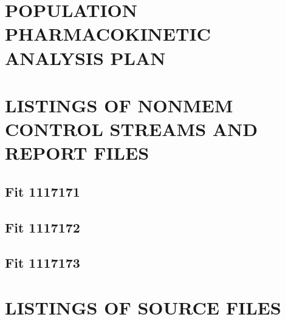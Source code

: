 

\section{POPULATION PHARMACOKINETIC ANALYSIS PLAN}
\label{sec:DAP}
%

\clearpage

\section{LISTINGS OF NONMEM CONTROL STREAMS AND REPORT FILES}
\label{sec:NMN}

\subsection{Fit \texorpdfstring{{\selectfont\textnumero}}{no.} 1117171}
\label{sec:nm.basemodel}
\lstset{breaklines=true, numbers=none, language=, basicstyle=\tiny\ttfamily, columns=flexible}


\clearpage

\subsection{Fit \texorpdfstring{{\selectfont\textnumero}}{no.} 1117172}
\label{sec:nm.fullcovmodel}


\clearpage

\subsection{Fit \texorpdfstring{{\selectfont\textnumero}}{no.} 1117173}
\label{sec:nm.finalmodel}


\clearpage

\section{LISTINGS OF SOURCE FILES}
\label{sec:SPL}

